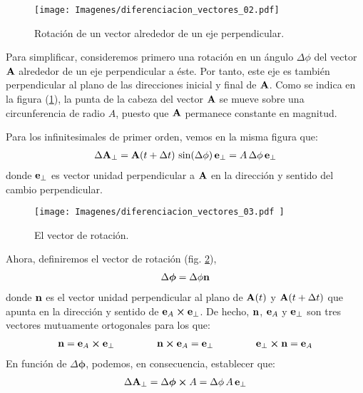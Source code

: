 \begin{figure}[H]
    \centering
    \texttt{[image: Imagenes/diferenciacion\_vectores\_02.pdf]}
    \caption{Rotación de un vector alrededor de un eje perpendicular.}
    \label{fig:figura_01_20}
\end{figure}
Para simplificar, consideremos primero una rotación en un ángulo $\Delta \phi$ del vector $\vb{A}$ alrededor de un eje perpendicular a éste. Por tanto, este eje es también perpendicular al plano de las direcciones inicial y final de $\vb{A}$. Como se indica en la figura (\ref{fig:figura_01_20}), la punta de la cabeza del vector $\vb{A}$ se mueve sobre una circunferencia de radio $A$, puesto que $\vb{A}$ permanece constante en magnitud. 
\par
Para los infinitesimales de primer orden, vemos en la misma figura que:
\begin{align}
    \Delta \vb{A}_{\perp} =  \vb{A} (t + \Delta t) \, \sin (\Delta \phi) \, \vb{e}_{\perp} = A \, \Delta \phi \, \vb{e}_{\perp}
    \label{eq:ecuacion_01_67}
\end{align}
donde $\vb{e}_\perp$ es vector unidad perpendicular a $\vb{A}$ en la dirección y sentido del cambio perpendicular. 
\begin{figure}[H]
    \centering
    \texttt{[image: Imagenes/diferenciacion\_vectores\_03.pdf   ]}
    \caption{El vector de rotación.}
    \label{fig:figura_01_21}
\end{figure}
Ahora, definiremos el vector de rotación (fig. \ref{fig:figura_01_21}),
\begin{align}
    \Delta \bm{\phi} = \Delta \phi \vb{n}
    \label{eq:ecuacion_01_68}
\end{align}
donde $\vb{n}$ es el vector unidad perpendicular al plano de $\vb{A} (t)$ y $\vb{A} (t + \Delta t)$ que apunta en la dirección y sentido de $\vb{e}_{A} \cp \vb{e}_{\perp}$. De hecho, $\vb{n}$, $\vb{e}_{A}$ y $\vb{e}_{\perp}$ son tres vectores mutuamente ortogonales para los que:
\begin{align}
    \vb{n} = \vb{e}_{A} \cp \vb{e}_{\perp} \hspace{1.5cm} \vb{n} \cp \vb{e}_{A} = \vb{e}_{\perp} \hspace{1.5cm} \vb{e}_{\perp} \cp \vb{n} = \vb{e}_{A}
    \label{eq:ecuacion_01_69}
\end{align} 
En función de $\Delta \bm{\phi}$, podemos, en consecuencia, establecer que:
\begin{align}
    \Delta \vb{A}_{\perp} = \Delta \bm{\phi} \cp A = \Delta \phi \, A \, \vb{e}_{\perp}
    \label{eq:ecuacion_01_70}
\end{align}
